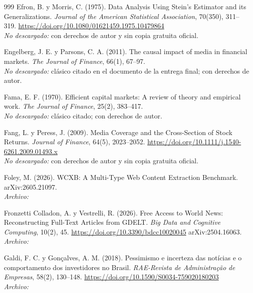 \begin{thebibliography}{999}
Efron, B. y Morris, C. (1975). Data Analysis Using {Stein}'s Estimator and its Generalizations. \emph{Journal of the American Statistical Association}, 70(350), 311--319. \url{https://doi.org/10.1080/01621459.1975.10479864}
\\\textit{No descargado:} con derechos de autor y sin copia gratuita oficial.

Engelberg, J. E. y Parsons, C. A. (2011). The causal impact of media in financial markets. \emph{The Journal of Finance}, 66(1), 67--97.
\\\textit{No descargado:} clásico citado en el documento de la entrega final; con derechos de autor.

Fama, E. F. (1970). Efficient capital markets: A review of theory and empirical work. \emph{The Journal of Finance}, 25(2), 383--417.
\\\textit{No descargado:} clásico citado; con derechos de autor.

Fang, L. y Peress, J. (2009). Media Coverage and the Cross-Section of Stock Returns. \emph{Journal of Finance}, 64(5), 2023--2052. \url{https://doi.org/10.1111/j.1540-6261.2009.01493.x}
\\\textit{No descargado:} con derechos de autor y sin copia gratuita oficial.

Foley, M. (2026). {WCXB}: A Multi-Type Web Content Extraction Benchmark. arXiv:2605.21097.
\\\textit{Archivo:} 

Fronzetti Colladon, A. y Vestrelli, R. (2026). Free Access to World News: Reconstructing Full-Text Articles from {GDELT}. \emph{Big Data and Cognitive Computing}, 10(2), 45. \url{https://doi.org/10.3390/bdcc10020045} arXiv:2504.16063.
\\\textit{Archivo:} 

Galdi, F. C. y Gon{\c{c}}alves, A. M. (2018). Pessimismo e incerteza das not{\'i}cias e o comportamento dos investidores no {Brasil}. \emph{RAE-Revista de Administra{\c{c}}{\~a}o de Empresas}, 58(2), 130--148. \url{https://doi.org/10.1590/S0034-759020180203}
\\\textit{Archivo:} 


\end{thebibliography}

